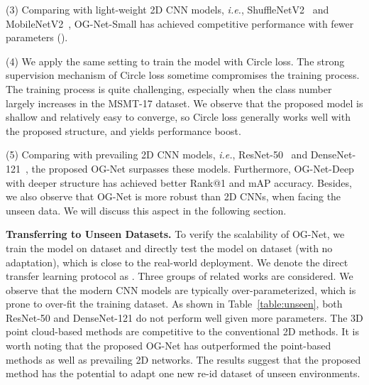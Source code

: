 \documentclass[journal]{IEEEtran}
\def\ie{\emph{i.e.}}
\begin{document}
(3) Comparing with light-weight 2D CNN models, \ie, ShuffleNetV2~\cite{zhang2018shufflenet} and MobileNetV2~\cite{sandler2018mobilenetv2}, OG-Net-Small has achieved competitive performance with fewer parameters (). 

(4) We apply the same setting to train the model with Circle loss. The strong supervision mechanism of Circle loss sometime compromises the training process. The training process is quite challenging, especially when the class number largely increases in the MSMT-17 dataset. We observe that the proposed model is shallow and relatively easy to converge, so Circle loss generally works well with the proposed structure, and yields performance boost.  

(5) Comparing with prevailing 2D CNN models, \ie, ResNet-50~\cite{he2016deep} and DenseNet-121~\cite{Huang2017Densely}, the proposed OG-Net surpasses these models. Furthermore, OG-Net-Deep with deeper structure has achieved better Rank@1 and mAP accuracy. Besides, we also observe that OG-Net is more robust than 2D CNNs, when facing the unseen data. We will discuss this aspect in the following section.  



\noindent\textbf{Transferring to Unseen Datasets.} To verify the scalability of OG-Net, we train the model on dataset  and directly test the model on dataset  (with no adaptation), which is close to the real-world deployment. We denote the direct transfer learning protocol as . Three groups of related works are considered. We observe that the modern CNN models are typically over-parameterized, which is prone to over-fit the training dataset. As shown in Table~\ref{table:unseen}, both ResNet-50 and DenseNet-121 do not perform well given more parameters. The 3D point cloud-based methods are competitive to the conventional 2D methods. 
It is worth noting that the proposed OG-Net has outperformed the point-based methods as well as prevailing 2D networks. The results suggest that the proposed method has the potential to adapt one new re-id dataset of unseen environments. 
\end{document}

